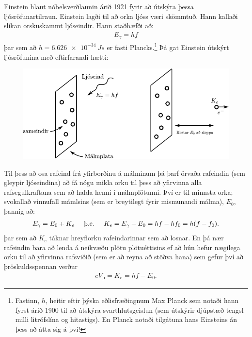 Einstein hlaut nóbelsverðlaunin árið 1921 fyrir að útskýra þessa ljósröfunartilraun. Einstein lagði til að orka ljóss væri skömmtuð. Hann kallaði slíkan orskuskammt ljóseindir. Hann staðhæfði að:
\begin{align*}
    E_\gamma = hf
\end{align*}
þar sem að $h = \SI{6.626e-34}{Js}$ er fasti Plancks.\footnote{Fastinn, $h$, heitir eftir þýska eðlisfræðingnum Max Planck sem notaði hann fyrst árið 1900 til að útskýra svarthlutsgeislun (sem útskýrir djúpstæð tengsl milli litrófslína og hitastigs). En Planck notaði tilgátuna hans Einsteins án þess að átta sig á því!} Þá gat Einstein útskýrt ljósröfunina með eftirfarandi hætti:

\begin{figure}[H]
    \centering
    \includegraphics{figures/einstein-uts.pdf}
\end{figure}

Til þess að osa rafeind frá yfirborðinu á málminum þá þarf örvaða rafeindin (sem gleypir ljóseindina) að fá nógu mikla orku til þess að yfirvinna alla rafsegulkraftana sem að halda henni í málmplötunni. Því er til minnsta orka; svokallað vinnufall mámlsins (sem er breytilegt fyrir mismunandi málma), $E_0$, þannig að:
\begin{align*}
    E_\gamma = E_0 + K_e \hspace{0.5cm} \text{þ.e.} \hspace{0.5cm} K_e = E_\gamma - E_0 = hf - hf_0 = h(f-f_0).
\end{align*}
þar sem að $K_e$ táknar hreyfiorku rafeindarinnar sem að losnar. En þá nær rafeindin bara að lenda á neikvæðu plötu plötuéttisins ef að hún hefur nægilega orku til að yfirvinna rafsviðið (sem er að reyna að stöðva hana) sem gefur því að þröskuldsspennan verður
\begin{align*}
    eV_{\text{þ}} = K_e = hf - E_0.
\end{align*}


